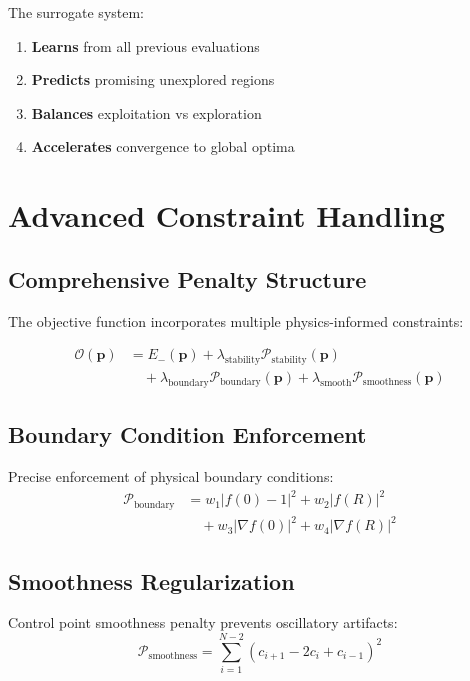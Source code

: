 \documentclass[11pt,a4paper]{article}
\begin{document}
The surrogate system:
\begin{enumerate}
\item \textbf{Learns} from all previous evaluations
\item \textbf{Predicts} promising unexplored regions
\item \textbf{Balances} exploitation vs exploration
\item \textbf{Accelerates} convergence to global optima
\end{enumerate}

\section{Advanced Constraint Handling}

\subsection{Comprehensive Penalty Structure}

The objective function incorporates multiple physics-informed constraints:

\begin{align}
\mathcal{O}(\mathbf{p}) &= E_-(\mathbf{p}) + \lambda_{\text{stability}} \mathcal{P}_{\text{stability}}(\mathbf{p}) \\
&\quad + \lambda_{\text{boundary}} \mathcal{P}_{\text{boundary}}(\mathbf{p}) + \lambda_{\text{smooth}} \mathcal{P}_{\text{smoothness}}(\mathbf{p})
\end{align}

\subsection{Boundary Condition Enforcement}

Precise enforcement of physical boundary conditions:
\begin{align}
\mathcal{P}_{\text{boundary}} &= w_1 |f(0) - 1|^2 + w_2 |f(R)|^2 \\
&\quad + w_3 |\nabla f(0)|^2 + w_4 |\nabla f(R)|^2
\end{align}

\subsection{Smoothness Regularization}

Control point smoothness penalty prevents oscillatory artifacts:
\begin{equation}
\mathcal{P}_{\text{smoothness}} = \sum_{i=1}^{N-2} (c_{i+1} - 2c_i + c_{i-1})^2
\end{equation}
\end{document}
